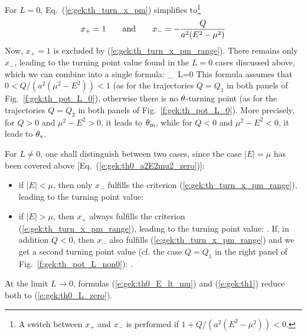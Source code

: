 For $L=0$, Eq.~(\ref{e:gek:th_turn_x_pm}) simplifies to\footnote{A switch between
$x_+$ and $x_-$ is performed if $1 + Q/(a^2(E^2 - \mu^2)) < 0$.}
\[
    x_+ = 1 \qquad\mbox{and}\qquad x_- = - \frac{Q}{a^2(E^2 - \mu^2)}
\]
Now, $x_+ = 1$ is excluded by (\ref{e:gek:th_turn_x_pm_range}). There remains
only $x_-$, leading to the turning point value found in the
$L=0$ cases discussed above, which we can combine into a single formula:
\be \label{e:gek:th0_L_zero}
   _{\, L=0}
\ee
This formula assumes that $0 < Q/(a^2 (\mu^2 - E^2)) < 1$ (as for the trajectories
$Q=Q_1$ in both panels of Fig.~\ref{f:gek:th_pot_L_0}),
otherwise there
is no $\theta$-turning point (as for the trajectories $Q=Q_2$ in both panels of
Fig.~\ref{f:gek:th_pot_L_0}).
More precisely, for $Q > 0$ and $\mu^2 - E^2 > 0$, it leads to $\theta_{\rm m}$, while
for $Q<0$ and $\mu^2 - E^2 < 0$, it leads to $\theta_{\rm v}$.

For $L\neq 0$, one shall distinguish between two cases, since the case $|E| = \mu$
has been covered above [Eq.~(\ref{e:gek:th0_a2E2mu2_zero})]:
\begin{itemize}
\item if $|E| < \mu$, then only $x_-$ fulfills the criterion (\ref{e:gek:th_turn_x_pm_range}),
leading to the turning point value:
\be \label{e:gek:th0_E_lt_mu}
\ee
\item if $|E| > \mu$, then $x_+$ always fulfills the criterion (\ref{e:gek:th_turn_x_pm_range}),
leading to the turning point value:
\be \label{e:gek:th0_E_gt_mu}
     .
\ee
If, in addition $Q<0$, then $x_-$ also fulfills (\ref{e:gek:th_turn_x_pm_range})
and we get a second turning point value (cf. the case $Q=Q_1$ in the
right panel of Fig.~\ref{f:gek:th_pot_L_non0}):
\be \label{e:gek:th1}
     .
\ee
\end{itemize}
\begin{remark}
At the limit $L\to 0$, formulas (\ref{e:gek:th0_E_lt_mu}) and
(\ref{e:gek:th1}) reduce both to (\ref{e:gek:th0_L_zero}).
\end{remark}


